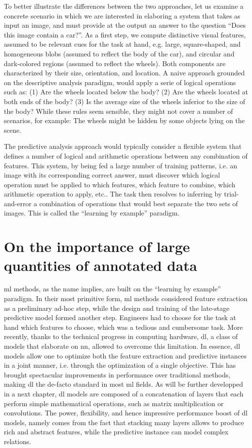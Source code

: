 To better illustrate the differences between the two approaches, let us examine a concrete scenario in which we are interested in elaboring a system that takes as input an image, and must provide at the output an answer to the question ``Does this image contain a car?''.
As a first step, we compute distinctive visual features, assumed to be relevant cues for the task at hand, e.g. large, square-shaped, and homogeneous blobs (assumed to reflect the body of the car), and circular and dark-colored regions (assumed to reflect the wheels).
Both components are characterized by their size, orientation, and location.
A naive approach grounded on the descriptive analysis paradigm, would apply a serie of logical operations such as: (1) Are the wheels located below the body? (2) Are the wheels located at both ends of the body? (3) Is the average size of the wheels inferior to the size of the body?
While these rules seem sensible, they might not cover a number of scenarios, for example: The wheels might be hidden by some objects lying on the scene.

The predictive analysis approach would typically consider a flexible system that defines a number of logical and arithmetic operations between any combination of features.
This system, by being fed a large number of training patterns, i.e. an image with its corresponding correct answer, must discover which logical operation must be applied to which features, which feature to combine, which arithmetic operation to apply, etc..
The task then resolves to inferring by trial-and-error a combination of operations that would best separate the two sets of images.
This is called the ``learning by example'' paradigm.

\section{On the importance of large quantities of annotated data}
\Gls{ml} methods, as the name implies, are built on the ``learning by example'' paradigm.
In their most primitive form, \gls{ml} methods considered feature extraction as a preliminary ad-hoc step, while the design and training of the late-stage predictive model formed another step.
Engineers had to choose for the task at hand which features to choose, which was a tedious and cumbersome task.
More recently, thanks to the technical progress in computing hardware, \gls{dl}, a class of models that elaborate on \gls{nn}, allowed to overcome this limitation.
In essence, \gls{dl} models allow one to optimize both the feature extraction and predictive instances in a joint manner, i.e. through the optimization of a single objective.
This has brought spectacular improvements in performance over traditional methods, making \gls{dl} the de-facto standard in most \gls{ml} fields.
As will be further developped in a next chapter, \gls{dl} models are composed of a concatenation of layers that each perform simple mathematical operations, such as matrix multiplication or convolutions.
The power, flexibility, and hence impressive performance boost of \gls{dl} models, namely comes from the fact that stacking many layers allows to produce rich and abstract features, while the predictive instance can model complex relations.

